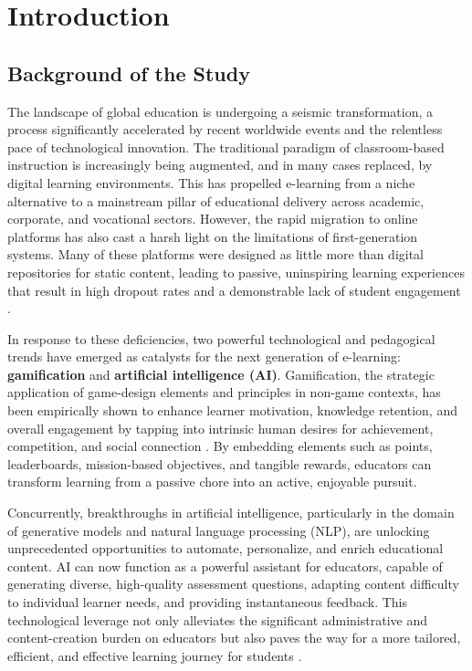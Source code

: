 \chapter{Introduction}
\label{chap:introduction}

\section{Background of the Study}
\label{sec:intro_background}
The landscape of global education is undergoing a seismic transformation, a process significantly accelerated by recent worldwide events and the relentless pace of technological innovation. The traditional paradigm of classroom-based instruction is increasingly being augmented, and in many cases replaced, by digital learning environments. This has propelled e-learning from a niche alternative to a mainstream pillar of educational delivery across academic, corporate, and vocational sectors. However, the rapid migration to online platforms has also cast a harsh light on the limitations of first-generation systems. Many of these platforms were designed as little more than digital repositories for static content, leading to passive, uninspiring learning experiences that result in high dropout rates and a demonstrable lack of student engagement \citep{lee2011}.

In response to these deficiencies, two powerful technological and pedagogical trends have emerged as catalysts for the next generation of e-learning: \textbf{gamification} and \textbf{artificial intelligence (AI)}. Gamification, the strategic application of game-design elements and principles in non-game contexts, has been empirically shown to enhance learner motivation, knowledge retention, and overall engagement by tapping into intrinsic human desires for achievement, competition, and social connection \citep{deterding2011}. By embedding elements such as points, leaderboards, mission-based objectives, and tangible rewards, educators can transform learning from a passive chore into an active, enjoyable pursuit.

Concurrently, breakthroughs in artificial intelligence, particularly in the domain of generative models and natural language processing (NLP), are unlocking unprecedented opportunities to automate, personalize, and enrich educational content. AI can now function as a powerful assistant for educators, capable of generating diverse, high-quality assessment questions, adapting content difficulty to individual learner needs, and providing instantaneous feedback. This technological leverage not only alleviates the significant administrative and content-creation burden on educators but also paves the way for a more tailored, efficient, and effective learning journey for students \citep{zawacki2019}.

